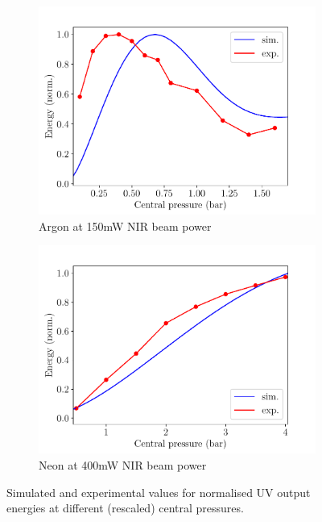 \documentclass[a4paper]{jpconf}
\begin{document}
\begin{figure}[h]
\centering
 \begin{subfigure}{0.5\textwidth}
\includegraphics[width=\textwidth]{im/energies_Ar}
\caption{Argon at 150mW NIR beam power}\label{im:sim_v_measured_Ar}
\end{subfigure}
 \begin{subfigure}{0.5\textwidth}
\includegraphics[width=\textwidth]{im/energies_Ne}
\caption{Neon at 400mW NIR beam power}\label{im:sim_v_measured_Ne}
\end{subfigure}
\caption{Simulated and experimental values for normalised UV output energies at different (rescaled) central pressures.}\label{im:sim_v_measured}
\end{figure}
\end{document}
